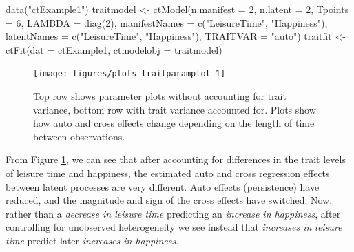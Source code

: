 \documentclass[nojss]{jss}\usepackage[]{graphicx}\usepackage[]{color}
\begin{document}
\begin{Schunk}
\begin{Sinput}
data("ctExample1")
traitmodel <- ctModel(n.manifest = 2, n.latent = 2, Tpoints = 6, 
  LAMBDA = diag(2), manifestNames = c("LeisureTime", "Happiness"), 
  latentNames = c("LeisureTime", "Happiness"), TRAITVAR = "auto")
traitfit <- ctFit(dat = ctExample1, ctmodelobj = traitmodel)
\end{Sinput}
\end{Schunk}

\begin{figure}[!h]
\begin{Schunk}


{\centering \texttt{[image: figures/plots-traitparamplot-1]} 

}

\end{Schunk}
\caption{ \label{fig:traitparamplots} Top row shows parameter plots without accounting for trait variance, bottom row with trait variance accounted for. Plots show how auto and cross effects change depending on the length of time between observations.}
\end{figure}
From Figure \ref{fig:traitparamplots}, we can see that after accounting for differences in the trait levels of leisure time and happiness, the estimated auto and cross regression effects between latent processes are very different. Auto effects (persistence) have reduced, and the magnitude and sign of the cross effects have switched. Now, rather than a \textit{decrease in leisure time} predicting an \textit{increase in happiness}, after controlling for unobserved heterogeneity we see instead that \textit{increases in leisure time} predict later \textit{increases in happiness}. 
\end{document}
